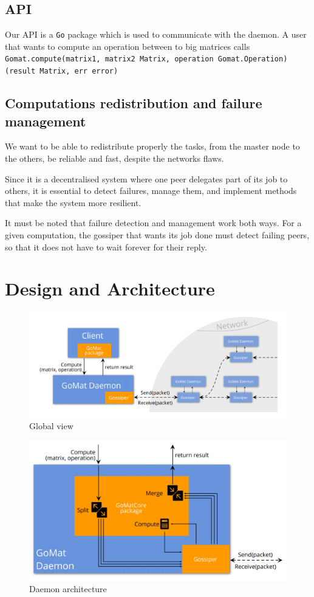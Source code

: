 \documentclass[a4paper,12pt]{article}
\newcommand{\Go}{\texttt{Go}\xspace}
\begin{document}
        \subsection{API}
        Our API is a \Go package which is used to communicate with the daemon. A user that wants to compute an operation between to big matrices calls\\
    \texttt{Gomat.compute(matrix1, matrix2 Matrix, operation Gomat.Operation) (result Matrix, err error)}

        \subsection{Computations redistribution and failure management}
    We want to be able to redistribute properly the tasks, from the master node to the others, be reliable and fast, despite the networks flaws.        
        
    Since it is a decentralised system where one peer delegates part of its job to others, it is essential to detect failures, manage them, and implement methods that make the system more resilient.

    It must be noted that failure detection and management work both ways. For a given computation, the gossiper that wants its job done must detect failing peers, so that it does not have to wait forever for their reply.

    \section{Design and Architecture}
    \begin{figure}[!ht]
        \includegraphics[width=.95\textwidth]{global_view.png}
        \caption{Global view}
        \label{glbView}
    \end{figure}
    \begin{figure}[!ht]
        \includegraphics[width=.95\textwidth]{daemon_view.PNG}
        \caption{Daemon architecture}
        \label{daemonView}
    \end{figure}
\end{document}
